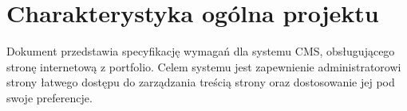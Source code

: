 \chapter{Charakterystyka ogólna projektu}
\label{cha:charakterystyka}
Dokument przedstawia specyfikację wymagań dla systemu CMS, obsługującego stronę internetową z portfolio. Celem systemu jest zapewnienie administratorowi strony łatwego dostępu do zarządzania treścią strony oraz dostosowanie jej pod swoje preferencje.
